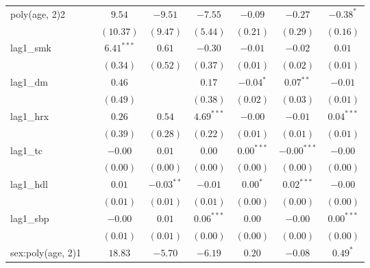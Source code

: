 \begin{tabular}{l c c c c c c c}
poly(age, 2)2        &               & $9.54$        & $-9.51$      & $-7.55$       & $-0.09$      & $-0.27$       & $-0.38^{*}$   \\
                     &               & $(10.37)$     & $(9.47)$     & $(5.44)$      & $(0.21)$     & $(0.29)$      & $(0.16)$      \\
lag1\_smk            &               & $6.41^{***}$  & $0.61$       & $-0.30$       & $-0.01$      & $-0.02$       & $0.01$        \\
                     &               & $(0.34)$      & $(0.52)$     & $(0.37)$      & $(0.01)$     & $(0.02)$      & $(0.01)$      \\
lag1\_dm             &               & $0.46$        &              & $0.17$        & $-0.04^{*}$  & $0.07^{**}$   & $-0.01$       \\
                     &               & $(0.49)$      &              & $(0.38)$      & $(0.02)$     & $(0.03)$      & $(0.01)$      \\
lag1\_hrx            &               & $0.26$        & $0.54$       & $4.69^{***}$  & $-0.00$      & $-0.01$       & $0.04^{***}$  \\
                     &               & $(0.39)$      & $(0.28)$     & $(0.22)$      & $(0.01)$     & $(0.01)$      & $(0.01)$      \\
lag1\_tc             &               & $-0.00$       & $0.01$       & $0.00$        & $0.00^{***}$ & $-0.00^{***}$ & $-0.00$       \\
                     &               & $(0.00)$      & $(0.00)$     & $(0.00)$      & $(0.00)$     & $(0.00)$      & $(0.00)$      \\
lag1\_hdl            &               & $0.01$        & $-0.03^{**}$ & $-0.01$       & $0.00^{*}$   & $0.02^{***}$  & $-0.00$       \\
                     &               & $(0.01)$      & $(0.01)$     & $(0.01)$      & $(0.00)$     & $(0.00)$      & $(0.00)$      \\
lag1\_sbp            &               & $-0.00$       & $0.01$       & $0.06^{***}$  & $0.00$       & $-0.00$       & $0.00^{***}$  \\
                     &               & $(0.01)$      & $(0.01)$     & $(0.00)$      & $(0.00)$     & $(0.00)$      & $(0.00)$      \\
sex:poly(age, 2)1    &               & $18.83$       & $-5.70$      & $-6.19$       & $0.20$       & $-0.08$       & $0.49^{*}$    \\

\end{tabular}
